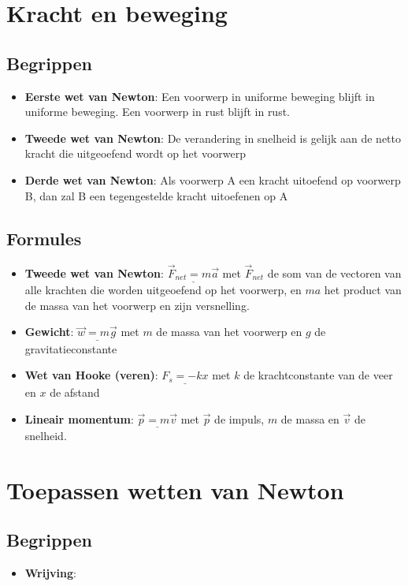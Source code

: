 \documentclass[12pt]{report}
\newcommand{\important}[1] {\textbf{\color{orange}#1}}
\begin{document}
\chapter{Kracht en beweging}
\section{Begrippen}
\begin{itemize}
\item {\important{Eerste wet van Newton}: Een voorwerp in uniforme beweging blijft in uniforme beweging. Een voorwerp in 
rust blijft in rust.}
\item {\important{Tweede wet van Newton}: De verandering in snelheid is gelijk aan de netto kracht die uitgeoefend wordt op het voorwerp}
\item {\important{Derde wet van Newton}: Als voorwerp A een kracht uitoefend op voorwerp B, dan zal B een tegengestelde kracht uitoefenen op A}

\end{itemize}

\section{Formules}
\begin{itemize}
  \item {\important{Tweede wet van Newton}: 
  $\underline{\overrightarrow{F}_{net} = m\overrightarrow{a}}$ met $\overrightarrow{F}_{net}$ de som van de vectoren van alle krachten die worden uitgeoefend 
  op het voorwerp, en $ma$ het product van de massa van het voorwerp en zijn versnelling.}
  \item {\important{Gewicht}: $\underline{\overrightarrow{w} = m\overrightarrow{g}}$ met $m$ de massa van het voorwerp en $g$ de gravitatieconstante}
  \item {\important{Wet van Hooke (veren)}: $\underline{F_{s} = -kx}$ met $k$ de krachtconstante van de veer en $x$ de afstand}
  \item {\important{Lineair momentum}: 
  $\underline{\overrightarrow{p} = m\overrightarrow{v}}$ 
  met $\overrightarrow{p}$ de impuls, $m$ de massa en $\overrightarrow{v}$ de snelheid.
  }
\end{itemize}
\chapter{Toepassen wetten van Newton}
\section{Begrippen}
\begin{itemize}
\item {\important{Wrijving}:}
\end{itemize}
\end{document}
